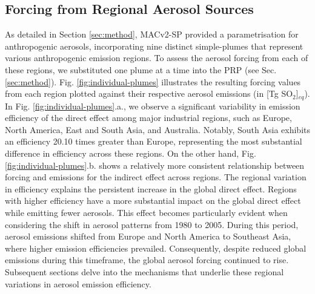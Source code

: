 \documentclass[draft]{agujournal2019}
\begin{document}
      \subsection{Forcing from Regional Aerosol Sources}
            As detailed in Section \ref{sec:method}, MACv2-SP provided a parametrisation for anthropogenic aerosols, incorporating nine distinct simple-plumes that represent various anthropogenic emission regions. To assess the aerosol forcing from each of these regions, we substituted one plume at a time into the PRP (see Sec. \ref{sec:method}). Fig. \ref{fig:individual-plumes} illustrates the resulting forcing values from each region plotted against their respective aerosol emissions (in [Tg SO$_2$]$_{eq}$). In Fig. \ref{fig:individual-plumes}.a., we observe a significant variability in emission efficiency of the direct effect among major industrial regions, such as Europe, North America, East and South Asia, and Australia. Notably, South Asia exhibits an efficiency 20.10 times greater than Europe, representing the most substantial difference in efficiency across these regions. On the other hand, Fig. \ref{fig:individual-plumes}.b. shows a relatively more consistent relationship between forcing and emissions for the indirect effect across regions. 
            The regional variation in efficiency explains the persistent increase in the global direct effect. Regions with higher efficiency have a more substantial impact on the global direct effect while emitting fewer aerosols. This effect becomes particularly evident when considering the shift in aerosol patterns from 1980 to 2005. During this period, aerosol emissions shifted from Europe and North America to Southeast Asia, where higher emission efficiencies prevailed. Consequently, despite reduced global emissions during this timeframe, the global aerosol forcing continued to rise.
            Subsequent sections delve into the mechanisms that underlie these regional variations in aerosol emission efficiency.
\end{document}
